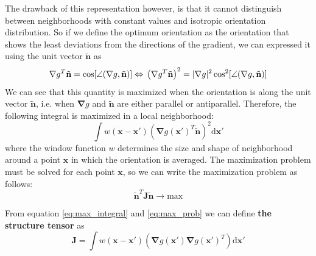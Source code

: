 		The drawback of this representation however, is that it cannot distinguish between neighborhoods with constant values and isotropic orientation distribution. So if we define the optimum orientation as the orientation that shows the least deviations from the directions of the gradient, we can expressed it using the unit vector $\tilde{\mathbf{n}}$ as
		\begin{equation}
			\mathbf{\nabla}g^T \tilde{\mathbf{n}} = \cos[\angle(\mathbf{\nabla}g, \tilde{\mathbf{n}})]\\
			\Leftrightarrow \\
			\left( \mathbf{\nabla}g^T \tilde{\mathbf{n}} \right)^2 = 
						 |\mathbf{\nabla}g|^2 \cos^2[\angle(\mathbf{\nabla}g, \tilde{\mathbf{n}})]
		\end{equation}
		We can see that this quantity is maximized when the orientation is along the unit vector $\tilde{\mathbf{n}}$, i.e. when $\mathbf{\nabla}g$ and $\tilde{\mathbf{n}}$ are either parallel or antiparallel. Therefore, the following integral is maximized in a local neighborhood:
		\begin{equation}
			\int w(\mathbf{x} - \mathbf{x'}) 
								\left( 
									 \mathbf{\nabla}g(\mathbf{x'})^T \tilde{\mathbf{n}}
								\right)^2
								\text{d}\mathbf{x'}
			\label{eq:max_integral}
		\end{equation}
		where the window function $w$ determines the size and shape of neighborhood around a point $\mathbf{x}$ in which the orientation is averaged. 		
		The maximization problem must be solved for each point $\mathbf{x}$, so we can write the maximization problem as follows:
		\begin{equation}
			\tilde{\mathbf{n}}^T \mathbf{J} \tilde{\mathbf{n}} \rightarrow \text{max}
			\label{eq:max_prob}
		\end{equation}
		
		From equation \ref{eq:max_integral} and \ref{eq:max_prob} we can define \textbf{the structure tensor} as 
		\begin{equation} 
			\mathbf{J} = \int w(\mathbf{x} - \mathbf{x'}) 
								\left( 
									\mathbf{\nabla}g(\mathbf{x'}) \mathbf{\nabla}g(\mathbf{x'})^T
								\right)
								\text{d}\mathbf{x'}
		\end{equation}
		
